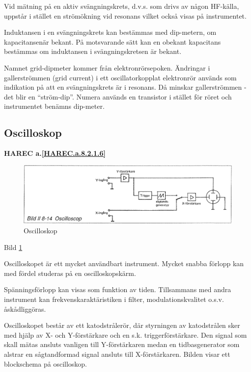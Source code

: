 Vid mätning på en aktiv svängningskrets, d.v.s. som drivs av någon
HF-källa, uppstår i stället en strömökning vid resonans vilket också
visas på instrumentet.

Induktansen i en svängningskrets kan bestämmas med dip-metern, om
kapacitansenär bekant. På motsvarande sätt kan en obekant kapacitans
bestämmas om induktansen i svängningskretsen är bekant.

Namnet grid-dipmeter kommer från elektronrörsepoken. Ändringar i
gallerströmmen (grid current) i ett oscillatorkopplat elektronrör
används som indikation på att en svängningskrets är i resonans. Då
minskar gallerströmmen - det blir en ``ström-dip''.  Numera används en
transistor i stället för röret och instrumentet benämns dip-meter.

\subsection{Oscilloskop}
\textbf{
HAREC a.\ref{HAREC.a.8.2.1.6}\label{myHAREC.a.8.2.1.6}
}

\begin{rev-omarbetas}
\begin{figure}
  \includegraphics[width=\textwidth]{images/bild_2_8-14}
  \caption{Oscilloskop}
  \label{fig:bildII8-14}
\end{figure}

Bild \ref{fig:bildII8-14}

Oscilloskopet är ett mycket användbart instrument. Mycket snabba
förlopp kan med fördel studeras på en oscilloskopskärm.

Spänningsförlopp kan visas som funktion av tiden. Tillsammans med
andra instrument kan frekvenskaraktäristiken i filter,
modulationskvalitet o.s.v. åskådliggöras.

Oscilloskopet består av ett katodstrålerör, där styrningen av
katodstrålen sker med hjälp av X- och Y-förstärkare och en s.k.
triggerförstärkare. Den signal som skall mätas ansluts vanligen till
Y-förstärkaren medan en tidbasgenerator som alstrar en sågtandformad
signal ansluts till X-förstärkaren.  Bilden visar ett blockschema på
oscilloskop.
\end{rev-omarbetas}

